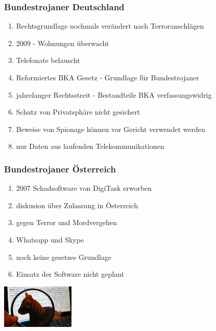 \documentclass{beamer}
\begin{document}
\begin{frame}
	\frametitle{Bundestrojaner Deutschland}
	\begin{enumerate}
		\item Rechtsgrundlage nochmals verändert nach Terroranschlägen
		\item 2009 - Wohnungen überwacht
		\item Telefonate belauscht
		\item Reformiertes BKA Gesetz - Grundlage für Bundestrojaner
		\item jahrelanger Rechtsstreit - Bestandteile BKA verfassungswidrig 
		\item Schutz von Privatsphäre nicht gesichert
		\item Beweise von Spionage können vor Gericht verwendet werden
		\item nur Daten aus laufenden Telekommunikationen 
	\end{enumerate}
\end{frame}


\begin{frame}
	\frametitle{Bundestrojaner Österreich}
	\begin{enumerate}
	\item 2007 Schadsoftware von DigiTask erworben
	\item diskusion über Zulassung in Österreich
	\item gegen Terror und Mordvergehen
	\item Whatsapp und Skype 
	\item noch keine gesetzes Grundlage 
	\item Einsatz der Software nicht geplant
	\end{enumerate}
	\flushright
	\includegraphics[width= 3.5cm]{bilder/oesterreich.jpg}
\end{frame}
\end{document}
